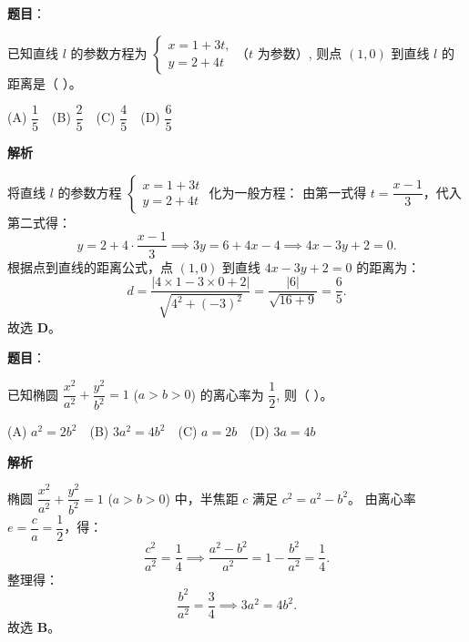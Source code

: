 \begin{answer}

\textbf{题目}：

已知直线 $l$ 的参数方程为 $\begin{cases} x = 1 + 3t, \\ y = 2 + 4t \end{cases}$（$t$ 为参数）, 则点 $(1, 0)$ 到直线 $l$ 的距离是（ ）。

(A) $\dfrac{1}{5}$　(B) $\dfrac{2}{5}$　(C) $\dfrac{4}{5}$　(D) $\dfrac{6}{5}$

\textbf{解析}

将直线 $l$ 的参数方程 $\begin{cases} x = 1 + 3t \\ y = 2 + 4t \end{cases}$ 化为一般方程：
由第一式得 $t = \dfrac{x - 1}{3}$，代入第二式得：
\nopagebreak[4]
\[y = 2 + 4 \cdot \frac{x - 1}{3} \implies 3y = 6 + 4x - 4 \implies 4x - 3y + 2 = 0.\]
根据点到直线的距离公式，点 $(1, 0)$ 到直线 $4x - 3y + 2 = 0$ 的距离为：
\nopagebreak[4]
\[d = \frac{|4 \times 1 - 3 \times 0 + 2|}{\sqrt{4^2 + (-3)^2}} = \frac{|6|}{\sqrt{16 + 9}} = \frac{6}{5}.\]
故选 \textbf{D}。


\end{answer}
\begin{answer}

\textbf{题目}：

已知椭圆 $\dfrac{x^2}{a^2} + \dfrac{y^2}{b^2} = 1$ ($a > b > 0$) 的离心率为 $\dfrac{1}{2}$, 则（ ）。

(A) $a^2 = 2b^2$　(B) $3a^2 = 4b^2$　(C) $a = 2b$　(D) $3a = 4b$

\textbf{解析}

椭圆 $\dfrac{x^2}{a^2} + \dfrac{y^2}{b^2} = 1$ ($a > b > 0$) 中，半焦距 $c$ 满足 $c^2 = a^2 - b^2$。
由离心率 $e = \dfrac{c}{a} = \dfrac{1}{2}$，得：
\nopagebreak[4]
\[\frac{c^2}{a^2} = \frac{1}{4} \implies \frac{a^2 - b^2}{a^2} = 1 - \frac{b^2}{a^2} = \frac{1}{4}.\]
整理得：
\nopagebreak[4]
\[\frac{b^2}{a^2} = \frac{3}{4} \implies 3a^2 = 4b^2.\]
故选 \textbf{B}。


\end{answer}
